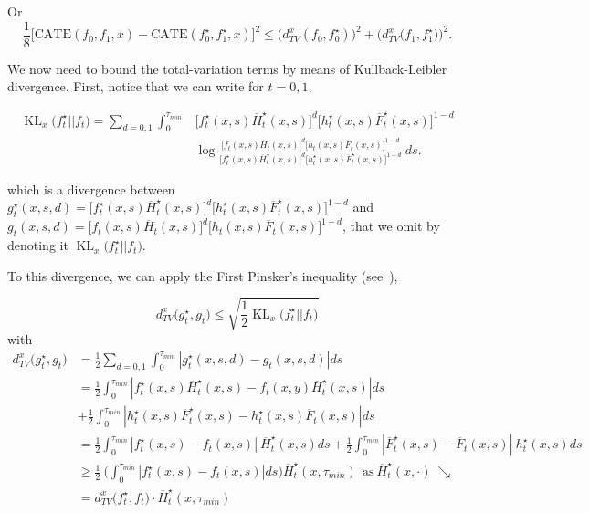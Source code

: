 \documentclass[12pt]{article}
\theoremstyle{plain}
\theoremstyle{definition}
\theoremstyle{remark}
\DeclareMathOperator{\KL}{\text{KL}}
\begin{document}
Or 
\begin{equation}
\label{catedtv}
    \frac18\Big[\text{CATE}( f_{0} ,f_{1} ,x)  -\text{CATE}( f^{\star}_{0} ,f^{\star}_{1} , x) \Big]^2 \leq   \big(d^{x}_{TV}( f_{0} ,f^{\star}_{0})\big)^2  +  \big(d^{x}_{TV}\big( f_{1} ,f^{\star}_{1})\big)^2.
\end{equation}

We now need to bound the total-variation terms by means of Kullback-Leibler divergence. First, notice that we can write for $t=0,1$,

\begin{align*}
    \KL_x \Big( f^{\star}_{t} ||f_{t}\Big) = \sum_{d=0,1} \int _{0}^{\tau_{min}}  &\Big[ f^{\star}_{t}( x,s)\overline{H}^{\star}_{t}( x,s)\Big]^{d }\Big[ h^{\star}_{t}( x,s)\overline{F}^{\star}_{t}( x,s)\Big]^{1-d } \\ 
    &\log \frac{ \Big[ f_{t}( x,s)\overline{H}_{t}( x,s)\Big]^{d }\Big[ h_{t}( x,s)\overline{F}_{t}( x,s)\Big]^{1-d }}{\Big[ f^{\star}_{t}( x,s)\overline{H}^{\star}_{t}( x,s)\Big]^{d }\Big[ h^{\star}_{t}( x,s)\overline{F}^{\star}_{t}( x,s)\Big]^{1-d }} \ ds.
\end{align*}

which is a divergence between $ g^{\star}_{t}( x,s,d)= \Big[ f^{\star}_{t}( x,s)\overline{H}^{\star}_{t}( x,s)\Big]^{d }\Big[ h^{\star}_{t}( x,s)\overline{F}^{\star}_{t}( x,s)\Big]^{1-d }$ and  $g_{t}( x,s,d)= \Big[ f_{t}( x,s)\overline{H}_{t}( x,s)\Big]^{d }\Big[ h_{t}( x,s)\overline{F}_{t}( x,s)\Big]^{1-d }$, that we omit by denoting it $ \KL_x \Big( f^{\star}_{t} ||f_{t}\Big)$.

To this divergence, we can apply the First Pinsker's inequality  (see~\cite{tsybakov2003introduction}),

\begin{equation}
    d^{x}_{TV}\Big( g_t^\star , g_t\Big) \leq \sqrt{\frac{1}{2}  \KL_x \Big( f^{\star}_{t} ||f_{t}\Big) }
\end{equation}
with 
\begin{align*}
    d^{x}_{TV}\Big( g_t^\star , g_t\Big) & = \frac{1}{2} \sum _{d=0,1}\int_{0}^{\tau_{min}} |g_t^\star(x,s,d) -g_t(x,s,d)|ds\\
&= \frac{1}{2}\int_{0}^{\tau_{min}}|f^{\star}_{t}( x,s)\overline{H}^{\star}_{t}( x,s) -f_{t}( x,y)\overline{H}^{\star}_{t}( x,s) |ds\\ &+ \frac{1}{2} \int_{0}^{\tau_{min}}|h^{\star}_{t}( x,s)\overline{F}^{\star}_{t}( x,s) -h^{\star}_{t}( x,s)\overline{F}_{t}( x,s) | ds \\
&=\frac{1}{2} \int_{0}^{\tau_{min}}|f^{\star}_{t}( x,s) -f_{t}(x,s) |\ \overline{H}^{\star}_{t}( x,s)ds  +  \frac{1}{2} \int_{0}^{\tau_{min}}|\overline{F}^{\star}_{t}( x,s) -\overline{F}_{t}( x,s) |\ h^{\star}_{t}( x,s)ds\\
&\geq \frac{1}{2} \ \Big(\int_{0}^{\tau_{min}}|f^{\star}_{t}( x,s) -f_{t}(x,s) |ds  \Big)\overline{H}^{\star}_{t}( x,\tau _{min}) \ \ \text{as}\ \overline{H}^{\star}_{t}( x,\cdotp ) \ \searrow \\
&= d_{TV}^x \Big( f^{\star}_{t} ,f_{t} \Big) \cdot \overline{H}^{\star}_{t}( x,\tau _{min})  
\end{align*}
\end{document}
